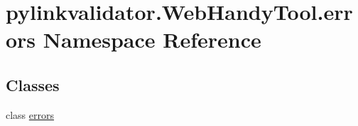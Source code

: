 \hypertarget{namespacepylinkvalidator_1_1_web_handy_tool_1_1errors}{}\section{pylinkvalidator.\+Web\+Handy\+Tool.\+errors Namespace Reference}
\label{namespacepylinkvalidator_1_1_web_handy_tool_1_1errors}
\subsection*{Classes}
\begin{DoxyCompactItemize}
\item 
class \hyperlink{classpylinkvalidator_1_1_web_handy_tool_1_1errors_1_1errors}{errors}
\end{DoxyCompactItemize}
